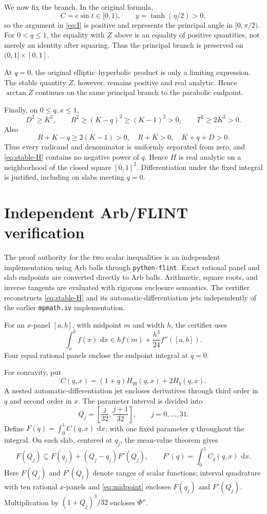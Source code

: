 \documentclass[11pt]{article}
\numberwithin{equation}{section}
\theoremstyle{remark}
\newcommand{\dd}{\,\mathrm d}
\begin{document}
We now fix the branch.  In the original formula,
\[
  C=e\sin t\in[0,1),
  \qquad y=\tanh(\eta/2)>0,
\]
so the argument in \eqref{eq:I} is positive and represents the principal angle in \([0,\pi/2)\).  For \(0<q\le1\), the equality with \(Z\) above is an equality of positive quantities, not merely an identity after squaring.  Thus the principal branch is preserved on \((0,1]\times[0,1]\).

At \(q=0\), the original elliptic--hyperbolic product is only a limiting expression.  The stable quantity \(Z\), however, remains positive and real analytic.  Hence \(\arctan Z\) continues on the same principal branch to the parabolic endpoint.

Finally, on \(0\le q,x\le1\),
\[
  D^2\ge K^2,
  \qquad
  R^2\ge(K-q)^2\ge(K-1)^2>0,
  \qquad
  T^2\ge2K^3>0.
\]
Also
\[
  R+K-q\ge2(K-1)>0,
  \quad R+K>0,
  \quad K+q+D>0.
\]
Thus every radicand and denominator is uniformly separated from zero, and \eqref{eq:stable-H} contains no negative power of \(q\).  Hence \(H\) is real analytic on a neighborhood of the closed square \([0,1]^2\).  Differentiation under the fixed integral is justified, including on slabs meeting \(q=0\).

\section{Independent Arb/FLINT verification}
\label{app:arb}

The proof authority for the two scalar inequalities is an independent implementation using Arb balls through \texttt{python-flint}.  Exact rational panel and slab endpoints are converted directly to Arb balls.  Arithmetic, square roots, and inverse tangents are evaluated with rigorous enclosure semantics.  The certifier reconstructs \eqref{eq:stable-H} and its automatic-differentiation jets independently of the earlier \texttt{mpmath.iv} implementation.

For an \(x\)-panel \([a,b]\), with midpoint \(m\) and width \(h\), the certifier uses
\begin{equation}
  \int_a^bf(x)\,\dd x
  \in h f(m)+\frac{h^3}{24}f''([a,b]).
  \label{eq:midpoint}
\end{equation}
Four equal rational panels enclose the endpoint integral at \(q=0\).

For concavity, put
\[
  C(q,x)=(1+q)H_{qq}(q,x)+2H_q(q,x).
\]
A nested automatic-differentiation jet encloses derivatives through third order in \(q\) and second order in \(x\).  The parameter interval is divided into
\[
  Q_j=\left[\frac j{32},\frac{j+1}{32}\right],
  \qquad j=0,\ldots,31.
\]
Define \(F(q)=\int_0^1 C(q,x)\,\dd x\), with one fixed parameter
\(q\) throughout the integral. On each slab, centered at \(q_j\),
the mean-value theorem gives
\[
  F(Q_j)\subseteq F(q_j)+(Q_j-q_j)F'(Q_j),
  \qquad F'(q)=\int_0^1C_q(q,x)\,\dd x.
\]
Here \(F(Q_j)\) and \(F'(Q_j)\) denote ranges of scalar functions;
interval quadrature with ten rational \(x\)-panels and \eqref{eq:midpoint}
encloses \(F(q_j)\) and \(F'(Q_j)\). Multiplication by
\((1+Q_j)^3/32\) encloses \(\Phi''\).
\end{document}
